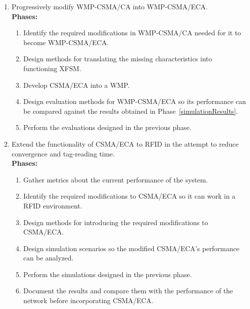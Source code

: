 \begin{enumerate}
	\item Progressively modify WMP-CSMA/CA into WMP-CSMA/ECA.\label{ECAinWMP}\\
	
	{\bfseries Phases:}
	\begin{enumerate}
		\item Identify the required modifications in WMP-CSMA/CA needed for it to become WMP-CSMA/ECA.\label{WMPModifications}
		\item Design methods for translating the missing characteristics into functioning XFSM.\label{accessByteCode}
		\item Develop CSMA/ECA into a WMP.
		\item Design evaluation methods for WMP-CSMA/ECA so its performance can be compared against the results obtained in Phase~\ref{simulationResults}.
		\item Perform the evaluations designed in the previous phase.\\
	\end{enumerate}

	\item Extend the functionality of CSMA/ECA to RFID in the attempt to reduce convergence and tag-reading time.\label{ECAinRFID}\\
	
	{\bfseries Phases:}
	\begin{enumerate}
		\item Gather metrics about the current performance of the system.
		\item Identify the required modifications to CSMA/ECA so it can work in a RFID environment.
		\item Design methods for introducing the required modifications to CSMA/ECA.
		\item Design simulation scenarios so the modified CSMA/ECA's performance can be analyzed.
		\item Perform the simulations designed in the previous phase.
		\item Document the results and compare them with the performance of the network before incorporating CSMA/ECA.\\
	\end{enumerate}

\end{enumerate}
